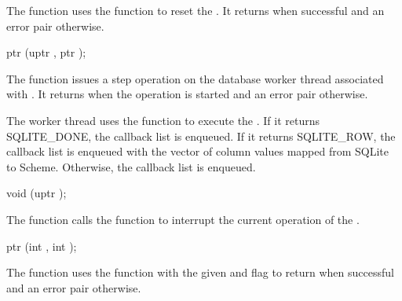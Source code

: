 The  function uses the
 function to reset the . It
returns  when successful and an error pair otherwise.

\begin{function}
  ptr (uptr , ptr );
\end{function}

The  function issues a step operation on
the database worker thread associated with . It returns
 when the operation is started and an error pair otherwise.

The worker thread uses the  function to execute
the . If it returns SQLITE\_DONE, the callback list
 is enqueued. If it returns SQLITE\_ROW,
the callback list  is
enqueued with the vector of column values mapped from SQLite to
Scheme. Otherwise, the callback list  is enqueued.

\begin{function}
  void (uptr );
\end{function}

The  function calls the
 function to interrupt the current operation
of the .

\begin{function}
  ptr (int , int );
\end{function}

The  function uses the
 function with the given  and
 flag to return 
when successful and an error pair otherwise.
